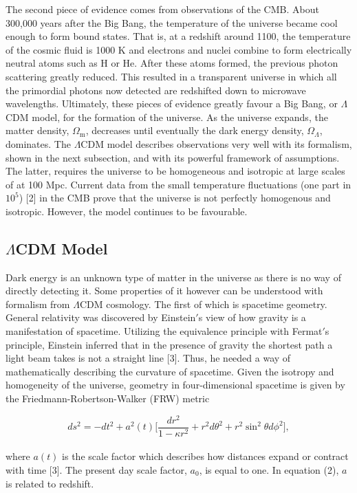 \documentclass[12pt]{article}
\begin{document}
	The second piece of evidence comes from observations of the CMB. About 300,000 years after the Big Bang, the temperature of the universe became cool enough to form bound states. That is, at a redshift around 1100, the temperature of the cosmic fluid is 1000 K and electrons and nuclei combine to form electrically neutral atoms such as H or He. After these atoms formed, the previous photon scattering greatly reduced. This resulted in a transparent universe in which all the primordial photons now detected are redshifted down to microwave wavelengths. Ultimately, these pieces of evidence greatly favour a Big Bang, or $\Lambda$CDM model, for the formation of the universe. As the universe expands, the matter density, $\Omega_\text{m}$, decreases until eventually the dark energy density, $\Omega_\Lambda$, dominates. The $\Lambda$CDM model describes observations very well with its formalism, shown in the next subsection, and with its powerful framework of assumptions. The latter, requires the universe to be homogeneous and isotropic at large scales of at 100 Mpc. Current data from the small temperature fluctuations (one part in $10^5$) [2] in the CMB prove that the universe is not perfectly homogenous and isotropic. However, the model continues to be favourable. 
	
	
	
	\subsection{$\Lambda$CDM Model}

Dark energy is an unknown type of matter in the universe as there is no way of directly detecting it. Some properties of it however can be understood with formalism from $\Lambda$CDM cosmology. The first of which is spacetime geometry. General relativity was discovered by Einstein$'$s view of how gravity is a manifestation of spacetime. Utilizing the equivalence principle with Fermat$'$s principle, Einstein inferred that in the presence of gravity the shortest path a light beam takes is not a straight line [3]. Thus, he needed a way of mathematically describing the curvature of spacetime. Given the isotropy and homogeneity of the universe, geometry in four-dimensional spacetime is given by the Friedmann-Robertson-Walker (FRW) metric

\begin{equation}
ds^2 = -dt^2 + a^2(t)\bigg[\frac{dr^2}{1-\kappa r^2}+r^2 d\theta ^2 + r^2\sin ^2 \theta d\phi ^2 \bigg], 
\end{equation}
\\
\noindent where $a(t)$ is the scale factor which describes how distances expand or contract with time [3]. The present day scale factor, $a_0$, is equal to one. In equation (2), $a$ is related to redshift.
\end{document}
